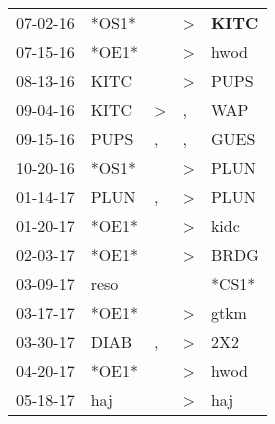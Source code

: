 \begin{supertabular}{p{0.07\textwidth}p{0.06\textwidth}p{0.02\textwidth}p{0.02\textwidth}p{0.06\textwidth}}
          07-02-16\textsuperscript{} &                            *OS1* &                  &     \textgreater &  \textbf{KITC\textsuperscript{}} \\
          07-15-16\textsuperscript{} &                            *OE1* &                  &     \textgreater &           hwod\textsuperscript{} \\
          08-13-16\textsuperscript{} &           KITC\textsuperscript{} &                  &     \textgreater &           PUPS\textsuperscript{} \\
          09-04-16\textsuperscript{} &           KITC\textsuperscript{} &     \textgreater &                , &            WAP\textsuperscript{} \\
          09-15-16\textsuperscript{} &           PUPS\textsuperscript{} &                , &                , &           GUES\textsuperscript{} \\
          10-20-16\textsuperscript{} &                            *OS1* &                  &     \textgreater &           PLUN\textsuperscript{} \\
          01-14-17\textsuperscript{} &           PLUN\textsuperscript{} &                , &     \textgreater &           PLUN\textsuperscript{} \\
          01-20-17\textsuperscript{} &                            *OE1* &                  &     \textgreater &           kidc\textsuperscript{} \\
          02-03-17\textsuperscript{} &                            *OE1* &                  &     \textgreater &           BRDG\textsuperscript{} \\
          03-09-17\textsuperscript{} &           reso\textsuperscript{} &                  &                  &                            *CS1* \\
          03-17-17\textsuperscript{} &                            *OE1* &                  &     \textgreater &           gtkm\textsuperscript{} \\
          03-30-17\textsuperscript{} &           DIAB\textsuperscript{} &                , &     \textgreater &            2X2\textsuperscript{} \\
          04-20-17\textsuperscript{} &                            *OE1* &                  &     \textgreater &           hwod\textsuperscript{} \\
          05-18-17\textsuperscript{} &            haj\textsuperscript{} &                  &     \textgreater &            haj\textsuperscript{} \\

\end{supertabular}
